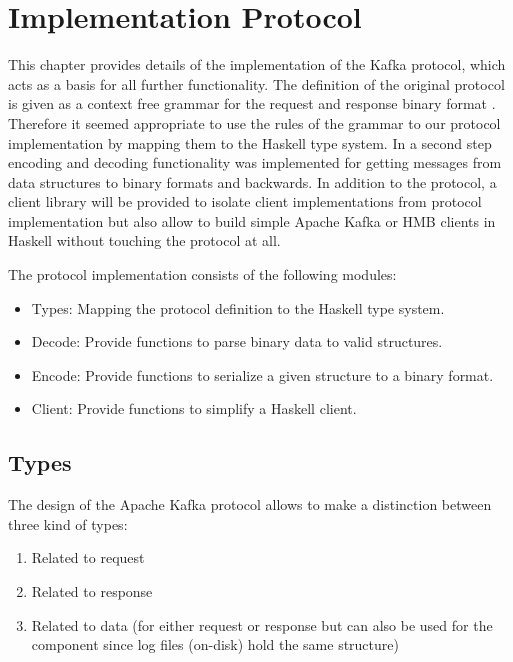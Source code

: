 \chapter{Implementation Protocol} 
\label{sec-protocol} 

This chapter provides details of the implementation of the Kafka protocol, which
acts as a basis for all further functionality. The definition of the original
protocol is given as a context free grammar for the request and response binary
format \cite{kafka-protocol}. Therefore it seemed appropriate to use the rules
of the grammar to our protocol implementation by mapping them to the Haskell
type system. In a second step encoding and decoding functionality was
implemented for getting messages from data structures to binary formats and
backwards. In addition to the protocol, a client library will be provided to
isolate client implementations from protocol implementation but also allow to
build simple Apache Kafka or HMB clients in Haskell without touching the
protocol at all.

The protocol implementation consists of the following modules: 
\begin{itemize}
    \item {Types: Mapping the protocol definition to the Haskell type system. }
    \item {Decode: Provide functions to parse binary data to valid structures. }
    \item {Encode: Provide functions to serialize a given structure to a binary
        format. }
    \item {Client: Provide functions to simplify a Haskell client.}
\end{itemize}

\section{Types}

The design of the Apache Kafka protocol allows to make a distinction between
three kind of types:

\begin{enumerate}
  \item Related to request
  \item Related to response
  \item Related to data (for either request or response but can also be used for
      the  component since log
      files (on-disk) hold the same structure) 
\end{enumerate}

